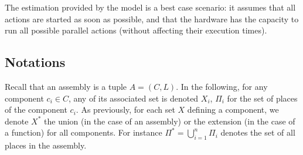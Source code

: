 The estimation provided by the model is a best case scenario: it
assumes that all actions are started as soon as possible, and that the
hardware has the capacity to run all possible parallel actions
(without affecting their execution times).

\subsection{Notations}



Recall that an assembly is a tuple $A = (C,L)$. In the following, for
any component $c_i \in C$, any of its associated set is denoted
$X_i$, \eg $\Pi_i$ for the set of places of the component $c_i$.  As
previously, for each set $X$ defining a component, we denote $X^*$ the
union (in the case of an assembly) or the extension (in the case of a
function) for all components. For instance
$\Pi^*=\bigcup_{i=1}^{n}\Pi_i$ denotes the set of all places in the
assembly.

